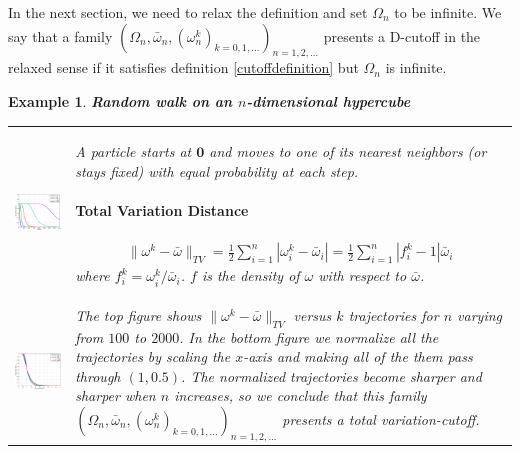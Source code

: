 \documentclass[landscape,a0b,final]{a0poster}
\newtheorem{example}{Example}
\newenvironment{poster}{
  \begin{center}
  \begin{minipage}[c]{0.98\textwidth}
}{
  \end{minipage} 
  \end{center}
}
\newenvironment{pcolumn}[1]{
  \begin{minipage}{#1\textwidth}
  \begin{center}
}{
  \end{center}
  \end{minipage}
}
\begin{document}
\begin{poster}
\begin{center}
\begin{pcolumn}{0.32}
{In the next section, we need to relax the definition and set $\Omega_n$ to be infinite. We say that a family $(\Omega_n,\bar{\omega}_n, (\omega^k_n)_{k=0,1,...})_{n=1,2,...}$ presents a D-cutoff in the relaxed sense if it satisfies definition \ref{cutoffdefinition} but $\Omega_n$ is infinite. 

\begin{example} \textbf{Random walk on an $n$-dimensional hypercube}
 
\vspace{0.3cm}
\begin{tabular}{c|l}
  \includegraphics[width=0.4\hsize]{rdwalk.eps} &
\begin{minipage}[b]{0.58\hsize}
A particle starts at $\mathbf{0}$ and moves to one of its nearest neighbors (or stays fixed) with equal probability at each step.
\vspace{-1cm}
\paragraph{Total Variation Distance}
  \begin{eqnarray*}
   \|\omega^k - \bar{\omega}\|_{TV} = \frac{1}{2}\sum_{i=1}^n |\omega_i^k-\bar{\omega}_i |= \frac{1}{2}\sum_{i=1}^n |f_i^k-1|\bar{\omega}_i
  \end{eqnarray*}
  where $f^k_i = \omega_i^k/\bar{\omega}_i$. $f$ is the density of $\omega$ with respect to $\bar{\omega}$.
\end{minipage}
\\
\includegraphics[width=0.4\hsize]{rdwalkn.eps} &
\begin{minipage}[b]{0.58\hsize}
The top figure shows $\|\omega^k - \bar{\omega}\|_{TV}$ versus $k$ trajectories for $n$ varying from $100$ to $2000$. In the bottom figure we normalize all the trajectories by scaling the $x$-axis and making all of the them pass through $(1, 0.5)$. The normalized trajectories become sharper and sharper when $n$ increases, so we conclude that this family $(\Omega_n,\bar{\omega}_n, (\omega^k_n)_{k=0,1,...})_{n=1,2,...}$ presents a total variation-cutoff.
\end{minipage}
\end{tabular}


\end{example}}
\end{pcolumn}
\end{center}
\end{poster}
\end{document}
